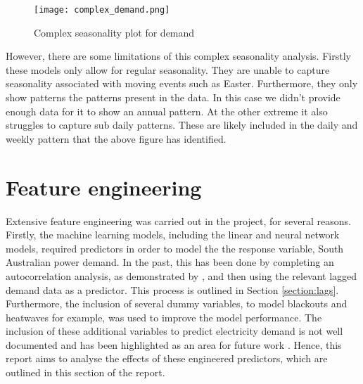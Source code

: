 \documentclass[11pt]{article}
\begin{document}
\begin{figure}[htpb!]
\centering
\begin{minipage}{.6\textwidth}
  \centering
  \texttt{[image: complex\_demand.png]}
   \caption{Complex seasonality plot for demand}
   \label{fig:complex_demand}
\end{minipage}%
\end{figure}

\noindent However, there are some limitations of this complex seasonality analysis. Firstly these models only allow for regular seasonality. They are unable to capture seasonality associated with moving events such as Easter. Furthermore, they only show patterns the patterns present in the data. In this case we didn't provide enough data for it to show an annual pattern. At the other extreme it also struggles to capture sub daily patterns. These are likely included in the daily and weekly pattern that the above figure has identified.

\section{Feature engineering}

Extensive feature engineering was carried out in the project, for several reasons. Firstly, the machine learning models, including the linear and neural network models, required predictors in order to model the the response variable, South Australian power demand. In the past, this has been done by completing an autocorrelation analysis, as demonstrated by \citet{sood_electricity_2010}, and then using the relevant lagged demand data as a predictor. This process is outlined in Section \ref{section:lags}. Furthermore, the inclusion of several dummy variables, to model blackouts and heatwaves for example, was used to improve the model performance. The inclusion of these additional variables to predict electricity demand is not well documented and has been highlighted as an area for future work \citep{kotillova_statistical_2012}. Hence, this report aims to analyse the effects of these engineered predictors, which are outlined in this section of the report.

\end{document}
